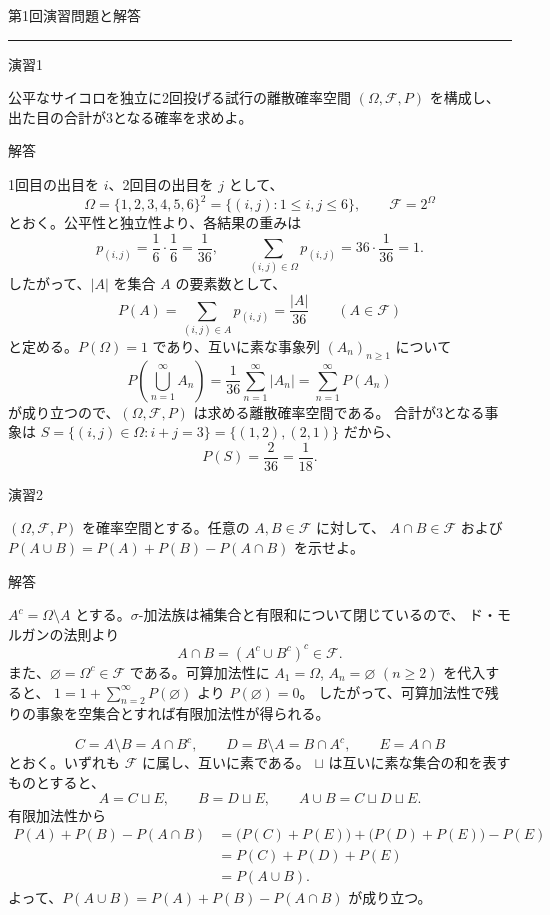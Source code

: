\documentclass[a4paper,10pt,pdflatex,ja=standard,jafont=ipaex-type1,
  magstyle=real,scale=1]{bxjsarticle}
\newcommand{\F}{\mathcal F}
\newcommand{\topic}[1]{\par\vspace{6pt}
  {\large\sffamily\mdseries\color{accent}#1}\par\vspace{3pt}}
\newcommand{\handouttitle}[1]{%
  \begin{center}
    {\Large\color{ink}#1}\par\vspace{3mm}
    {\color{accent}\rule{0.88\linewidth}{0.7pt}}
  \end{center}\vspace{-2mm}}
\newcommand{\problem}[1]{\par\vspace{3pt}\begingroup
  \setlength{\fboxsep}{5pt}
  \colorbox{soft}{\parbox{\dimexpr\linewidth-2\fboxsep\relax}{#1}}%
  \endgroup\par\vspace{4pt}}
\newcommand{\answerlabel}{{\sffamily\mdseries\color{ink}解答}\par}
\begin{document}
\fontsize{10pt}{13.5pt}\selectfont
\handouttitle{第1回\quad 演習問題と解答}

\topic{演習1}
\problem{公平なサイコロを独立に2回投げる試行の離散確率空間
$(\Omega,\F,P)$ を構成し、出た目の合計が3となる確率を求めよ。}

\answerlabel
1回目の出目を $i$、2回目の出目を $j$ として、
$$
  \Omega=\{1,2,3,4,5,6\}^2
    =\{(i,j):1\le i,j\le6\},\qquad \F=2^\Omega
$$
とおく。公平性と独立性より、各結果の重みは
$$
  p_{(i,j)}=\frac16\cdot\frac16=\frac1{36},\qquad
  \sum_{(i,j)\in\Omega}p_{(i,j)}=36\cdot\frac1{36}=1.
$$
したがって、$|A|$ を集合 $A$ の要素数として、
$$
  P(A)=\sum_{(i,j)\in A}p_{(i,j)}=\frac{|A|}{36}
  \qquad(A\in\F)
$$
と定める。$P(\Omega)=1$ であり、互いに素な事象列 $(A_n)_{n\ge1}$ について
$$
  P\!\left(\bigcup_{n=1}^\infty A_n\right)
  =\frac1{36}\sum_{n=1}^\infty|A_n|
  =\sum_{n=1}^\infty P(A_n)
$$
が成り立つので、$(\Omega,\F,P)$ は求める離散確率空間である。
合計が3となる事象は $S=\{(i,j)\in\Omega:i+j=3\}=\{(1,2),(2,1)\}$ だから、
$$
  \boxed{P(S)=\frac2{36}=\frac1{18}}.
$$

\topic{演習2}
\problem{$(\Omega,\F,P)$ を確率空間とする。任意の $A,B\in\F$ に対して、
$A\cap B\in\F$ および $P(A\cup B)=P(A)+P(B)-P(A\cap B)$ を示せよ。}

\answerlabel
$A^c=\Omega\setminus A$ とする。$\sigma$-加法族は補集合と有限和について閉じているので、
ド・モルガンの法則より
$$
  A\cap B=(A^c\cup B^c)^c\in\F.
$$
また、$\varnothing=\Omega^c\in\F$ である。可算加法性に
$A_1=\Omega$, $A_n=\varnothing$ $(n\ge2)$ を代入すると、
$1=1+\sum_{n=2}^\infty P(\varnothing)$ より $P(\varnothing)=0$。
したがって、可算加法性で残りの事象を空集合とすれば有限加法性が得られる。

$$
  C=A\setminus B=A\cap B^c,\qquad
  D=B\setminus A=B\cap A^c,\qquad E=A\cap B
$$
とおく。いずれも $\F$ に属し、互いに素である。
$\sqcup$ は互いに素な集合の和を表すものとすると、
$$
  A=C\sqcup E,\qquad B=D\sqcup E,\qquad
  A\cup B=C\sqcup D\sqcup E.
$$
有限加法性から
$$
  \begin{aligned}
    P(A)+P(B)-P(A\cap B)
      &=\bigl(P(C)+P(E)\bigr)+\bigl(P(D)+P(E)\bigr)-P(E)\\
      &=P(C)+P(D)+P(E)\\
      &=P(A\cup B).
  \end{aligned}
$$
よって、$\boxed{P(A\cup B)=P(A)+P(B)-P(A\cap B)}$ が成り立つ。
\end{document}
